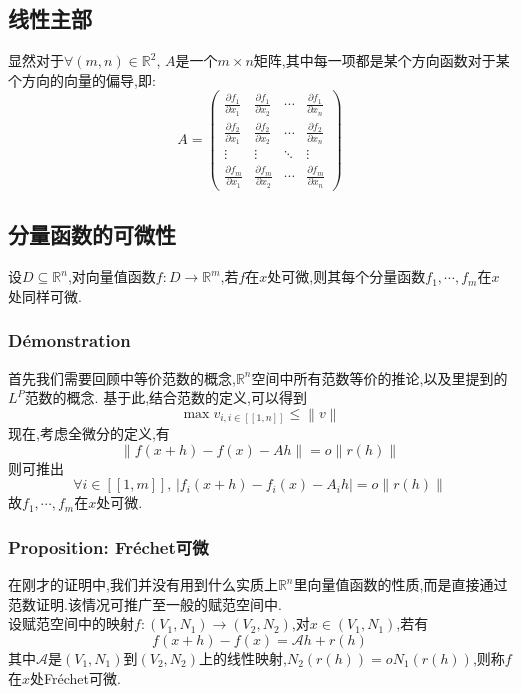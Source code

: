 \documentclass[12pt, a4paper, oneside]{ctexbook}
\begin{document}
    \subsection{线性主部}
    显然对于$\forall (m,n)\in\mathbb{R}^2$, $A$是一个$m\times n$矩阵,其中每一项都是某个方向函数对于某个方向的向量的偏导,即:
    $$
     A=\begin{pmatrix}
      \frac{\partial f_1}{\partial x_1}&\frac{\partial f_1}{\partial x_2}  &\cdots  &\frac{\partial f_1}{\partial x_n} \\
      \frac{\partial f_2}{\partial x_1}&\frac{\partial f_2}{\partial x_2}  & \cdots & \frac{\partial f_2}{\partial x_n}\\ 
      \vdots& \vdots & \ddots  & \vdots\\
      \frac{\partial f_m}{\partial x_1}&\frac{\partial f_m}{\partial x_2} &\cdots & \frac{\partial f_m}{\partial x_n} 
    \end{pmatrix}
    $$

    \subsection{分量函数的可微性}
    设$D\subseteq \mathbb{R}^n$,对向量值函数$f:D\rightarrow \mathbb{R}^m$,若$f$在$x$处可微,则其每个分量函数$f_1,\cdots,f_m$在$x$处同样可微.
    \subsubsection{Démonstration}
    首先我们需要回顾中等价范数的概念,$\mathbb{R}^n$空间中所有范数等价的推论,以及里提到的$L^P$范数的概念.
    基于此,结合范数的定义,可以得到
    $$
    \max v_{i,i\in[\![1,n]\!] }\leq \left\lVert v\right\rVert 
    $$
    现在,考虑全微分的定义,有
    $$
    \left\lVert f(x+h)-f(x)-Ah\right\rVert =o\left\lVert r(h) \right\rVert 
    $$
    则可推出
    $$
    \forall i \in [\![1,m]\!],\,\left\lvert f_i(x+h)-f_i(x)-A_ih \right\rvert =o\left\lVert r(h) \right\rVert
    $$
    故$f_1,\cdots,f_m$在$x$处可微.
    \subsubsection{Proposition: Fréchet可微}
    在刚才的证明中,我们并没有用到什么实质上$\mathbb{R}^n$里向量值函数的性质,而是直接通过范数证明.该情况可推广至一般的赋范空间中.\\

    设赋范空间中的映射$f:(V_1,N_1)\rightarrow (V_2,N_2)$,对$x\in (V_1,N_1)$,若有
    $$
      f(x+h)-f(x)=\mathcal{A} h+r(h)
    $$
    其中$\mathcal{A}$是$(V_1,N_1)$到$ (V_2,N_2)$上的线性映射,$N_2(r(h))=oN_1(r(h))$,则称$f$在$x$处Fréchet可微.
\end{document}
